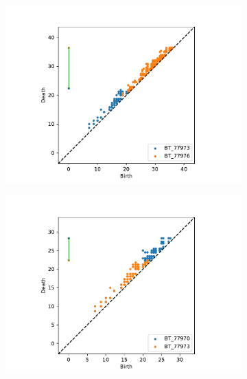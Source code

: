 \begin{figure}[ht]
  \centering
  \begin{subfigure}{.49 \linewidth}
  \includegraphics[scale=0.5]{matchings/77973-77976.pdf}
  \end{subfigure}%
  \begin{subfigure}{.49 \linewidth}
  \includegraphics[scale=0.5]{matchings/77970-77973.pdf}
  \end{subfigure}
  \begin{subfigure}{.49 \linewidth}

\end{subfigure}
\end{figure}
